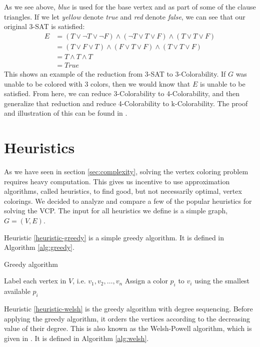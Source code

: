 \documentclass{article}
\newcounter{heuristic} \setcounter{heuristic}{0}
\theoremstyle{definition}
\begin{document}
As we see above, \emph{blue} is used for the base vertex and as part of some of the clause triangles. If we let \emph{yellow} denote \emph{true} and \emph{red} denote \emph{false}, we can see that our original 3-SAT is satisfied:
%
\begin{align*}
E &= \left( T \vee \neg T \vee \neg F \right) \wedge \left( \neg T \vee T \vee F \right) \wedge \left(T \vee T \vee F \right) \\
&= \left( T \vee F \vee T \right) \wedge \left( F \vee T \vee F \right) \wedge \left(T \vee T \vee F \right) \\
&= T \wedge T \wedge T \\
&= True
\end{align*}
%
This shows an example of the reduction from 3-SAT to 3-Colorability. If \(G\) was unable to be colored with 3 colors, then we would know that \(E\) is unable to be satisfied. From here, we can reduce 3-Colorability to 4-Colorability, and then generalize that reduction and reduce 4-Colorability to k-Colorability. The proof and illustration of this can be found in \cite{sharma}.

\section{Heuristics}
As we have seen in section \ref{sec:complexity}, solving the vertex coloring problem requires heavy computation. This gives us incentive to use approximation algorithms, called heuristics, to find good, but not necessarily optimal, vertex colorings. We decided to analyze and compare a few of the popular heuristics for solving the VCP. The input for all heuristics we define is a simple graph, $G = (V, E)$.

\label{heuristic-greedy}

Heuristic \ref{heuristic-greedy} is a simple greedy algorithm. It is defined in Algorithm \ref{alg:greedy}.

\begin{algorithm}
\caption{Greedy algorithm}\label{alg:greedy}
\begin{algorithmic}[1]
\State Label each vertex in $V$, i.e. $v_1, v_2, \dots, v_n$
\State Assign a color $p_i$ to $v_i$ using the smallest available $p_i$
\EndFor
\end{algorithmic}
\end{algorithm}

\label{heuristic-welsh}

Heuristic \ref{heuristic-welsh} is the greedy algorithm with degree sequencing. Before applying the greedy algorithm, it orders the vertices according to the decreasing value of their degree. This is also known as the Welsh-Powell algorithm, which is given in \cite{welsh}. It is defined in Algorithm \ref{alg:welsh}.
\end{document}
